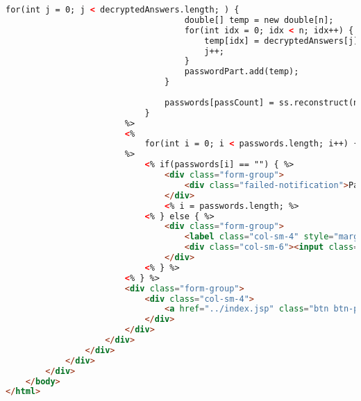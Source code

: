 \begin{lstlisting}[language=html,basicstyle=\tiny,caption=retrieve\_process.jsp]
                                for(int j = 0; j < decryptedAnswers.length; ) {
                                    double[] temp = new double[n];
                                    for(int idx = 0; idx < n; idx++) {
                                        temp[idx] = decryptedAnswers[j];
                                        j++;
                                    }
                                    passwordPart.add(temp);
                                }
                                
                                passwords[passCount] = ss.reconstruct(n, k, passwordPart);
                            }
                        %>
                        <%
                            for(int i = 0; i < passwords.length; i++) {
                        %>
                            <% if(passwords[i] == "") { %>
                                <div class="form-group">
                                    <div class="failed-notification">Password cannot be retrieved</div>
                                </div>
                                <% i = passwords.length; %>
                            <% } else { %>
                                <div class="form-group">
                                    <label class="col-sm-4" style="margin-top:7px;">Your password is</label>
                                    <div class="col-sm-6"><input class="form-control" type="text" value="<%= passwords[i] %>" disabled/></div>
                                </div>
                            <% } %>
                        <% } %>
                        <div class="form-group">
                            <div class="col-sm-4">
                                <a href="../index.jsp" class="btn btn-primary">Done</a>
                            </div>
                        </div>
                    </div>
                </div>
            </div>
        </div>
    </body>
</html>

\end{lstlisting}


